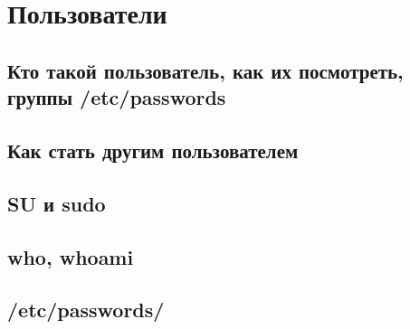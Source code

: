 \section{Пользователи}

\subsection{Кто такой пользователь, как их посмотреть, группы /etc/passwords}
\subsection{Как стать другим пользователем}
\subsection{SU и sudo}
\subsection{who, whoami}
\subsection{/etc/passwords/}
\newpage